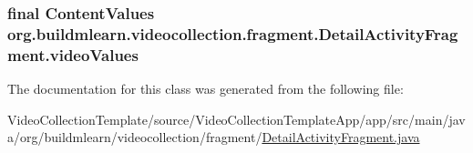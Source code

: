 \subsubsection[{\texorpdfstring{video\+Values}{videoValues}}]{\setlength{\rightskip}{0pt plus 5cm}final Content\+Values org.\+buildmlearn.\+videocollection.\+fragment.\+Detail\+Activity\+Fragment.\+video\+Values\hspace{0.3cm}{\ttfamily [private]}}\hypertarget{classorg_1_1buildmlearn_1_1videocollection_1_1fragment_1_1DetailActivityFragment_a1121174d70919db7f4037a6ac38eb9c6}{}\label{classorg_1_1buildmlearn_1_1videocollection_1_1fragment_1_1DetailActivityFragment_a1121174d70919db7f4037a6ac38eb9c6}


The documentation for this class was generated from the following file\+:\begin{DoxyCompactItemize}
\item 
Video\+Collection\+Template/source/\+Video\+Collection\+Template\+App/app/src/main/java/org/buildmlearn/videocollection/fragment/\hyperlink{VideoCollectionTemplate_2source_2VideoCollectionTemplateApp_2app_2src_2main_2java_2org_2buildmle0499cacd4ed87567fd1ea39b0dbd3950}{Detail\+Activity\+Fragment.\+java}\end{DoxyCompactItemize}
